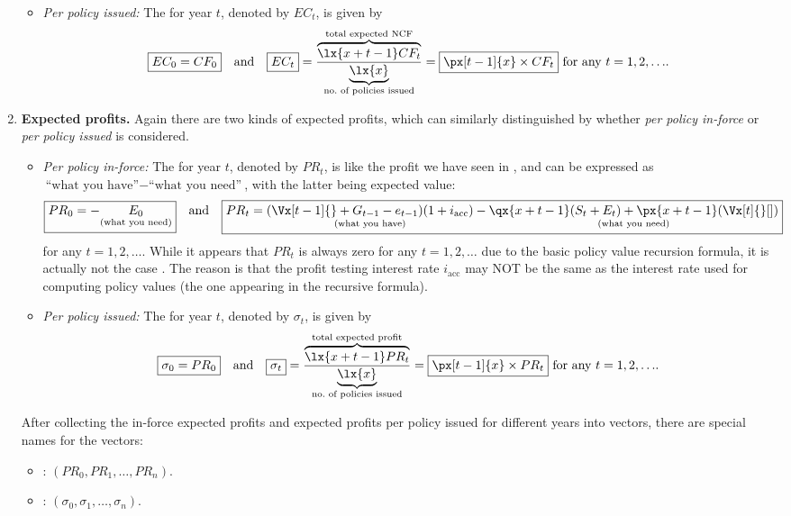 \begin{enumerate}
\begin{itemize}
\item \emph{Per policy issued:} The  for year \(t\), denoted by \(EC_{t}\), is given by
\[
\boxed{EC_{0}=CF_{0}}\qqtext{and}
\boxed{EC_{t}}=\frac{\overbrace{\lx{x+t-1}CF_{t}}^{\mathclap{\text{total expected NCF}}}}
{\underbrace{\lx{x}}_{\mathclap{\text{no.\ of policies issued}}}}=\boxed{\px[t-1]{x}\times CF_{t}}
\text{ for any \(t=1,2,\dotsc\)}.
\]
\end{itemize}
\item \label{it:exp-profit-fmlas} \textbf{Expected profits.} Again there are
two kinds of expected profits, which can similarly distinguished by whether
\emph{per policy in-force} or \emph{per policy issued} is considered.
\begin{itemize}
\item \emph{Per policy in-force:} The  for year
\(t\), denoted by \(PR_{t}\), is like the profit we have seen in
, and can be expressed as \(\text{``what you
have''}-\text{``what you need''}\), with the latter being expected value:
\[
\boxed{PR_{0}=-\underset{\text{(what you need)}}{E_0}}\qqtext{and}
\boxed{PR_{t}=\underset{\text{(what you have)}}{(\Vx[t-1]{}+G_{t-1}-e_{t-1})(1+i_{\mathrm{acc}})}-
\underset{\text{(what you need)}}{\qx{x+t-1}(S_{t}+E_{t})+\px{x+t-1}(\Vx[t]{}[])}}
\]
for any \(t=1,2,\dotsc\). While it appears that \(PR_{t}\) is always zero for
any \(t=1,2,\dotsc\) due to the basic policy value recursion formula, it is
actually not the case \warn{}. The reason is that the profit testing
interest rate \(i_{\mathrm{acc}}\) may NOT be the same as the interest rate
used for computing policy values (the one appearing in the recursive formula).
\item \emph{Per policy issued:} The 
for year \(t\), denoted by \(\sigma_t\), is given by
\[
\boxed{\sigma_0=PR_{0}}\qqtext{and}
\boxed{\sigma_{t}}=\frac{\overbrace{\lx{x+t-1}PR_{t}}^{\mathclap{\text{total expected profit}}}}
{\underbrace{\lx{x}}_{\mathclap{\text{no.\ of policies issued}}}}=\boxed{\px[t-1]{x}\times PR_{t}}
\text{ for any \(t=1,2,\dotsc\)}.
\]
\end{itemize}
After collecting the in-force expected profits and expected profits per policy
issued for different years into vectors, there are special names for the
vectors:
\begin{itemize}
\item {}: \((PR_{0},PR_{1},\dotsc,PR_{n})\).
\item {}: \((\sigma_{0},\sigma_{1},\dotsc,\sigma_{n})\).

\end{itemize}
\end{enumerate}
